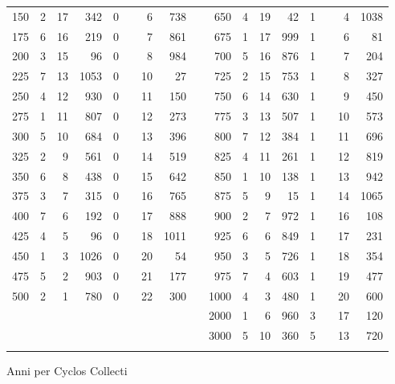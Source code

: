 \begin{tabnums}
\begin{tabular}[c]{@{} r rrr r@{}lrr c r rrr r@{}lrr @{}}
 150 & 2 & 17 &  342 & 0&&  6 &  738 &&  650 & 4 & 19 &   42 & 1&&  4 & 1038 \\
 175 & 6 & 16 &  219 & 0&&  7 &  861 &&  675 & 1 & 17 &  999 & 1&&  6 &   81 \\
 200 & 3 & 15 &   96 & 0&&  8 &  984 &&  700 & 5 & 16 &  876 & 1&&  7 &  204 \\
 225 & 7 & 13 & 1053 & 0&& 10 &   27 &&  725 & 2 & 15 &  753 & 1&&  8 &  327 \\
 250 & 4 & 12 &  930 & 0&& 11 &  150 &&  750 & 6 & 14 &  630 & 1&&  9 &  450 \\
 275 & 1 & 11 &  807 & 0&& 12 &  273 &&  775 & 3 & 13 &  507 & 1&& 10 &  573 \\
 300 & 5 & 10 &  684 & 0&& 13 &  396 &&  800 & 7 & 12 &  384 & 1&& 11 &  696 \\
 325 & 2 &  9 &  561 & 0&& 14 &  519 &&  825 & 4 & 11 &  261 & 1&& 12 &  819 \\
 350 & 6 &  8 &  438 & 0&& 15 &  642 &&  850 & 1 & 10 &  138 & 1&& 13 &  942 \\
 375 & 3 &  7 &  315 & 0&& 16 &  765 &&  875 & 5 &  9 &   15 & 1&& 14 & 1065 \\
 400 & 7 &  6 &  192 & 0&& 17 &  888 &&  900 & 2 &  7 &  972 & 1&& 16 &  108 \\
 425 & 4 &  5 &   96 & 0&& 18 & 1011 &&  925 & 6 &  6 &  849 & 1&& 17 &  231 \\
 450 & 1 &  3 & 1026 & 0&& 20 &   54 &&  950 & 3 &  5 &  726 & 1&& 18 &  354 \\
 475 & 5 &  2 &  903 & 0&& 21 &  177 &&  975 & 7 &  4 &  603 & 1&& 19 &  477 \\
 500 & 2 &  1 &  780 & 0&& 22 &  300 && 1000 & 4 &  3 &  480 & 1&& 20 &  600 \\
     &   &    &      &  &&    &      && 2000 & 1 &  6 &  960 & 3&\super{*}
 & 17 &  120 \\
     &   &    &      &  &&    &      && 3000 & 5 & 10 &  360 & 5&\super{*}
 & 13 &  720 \\
\bottomrule
\addlinespace[5pt]
\multicolumn{3}{r}{\footnotesize\super{*}In originalis: 1}
\end{tabular}
\caption{Anni per Cyclos Collecti}
\label{tab:p203a}
\end{tabnums}
